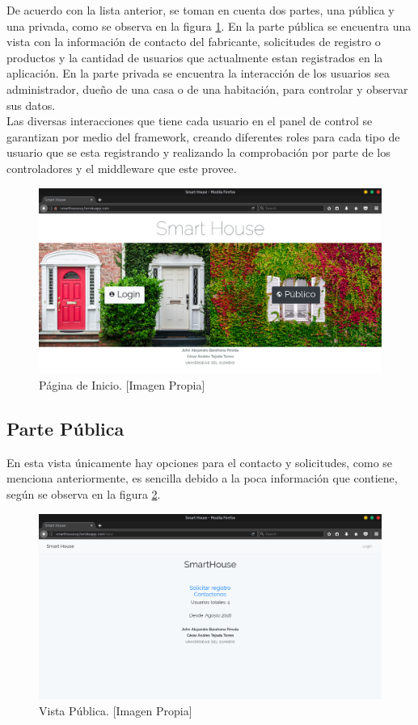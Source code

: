 De acuerdo con la lista anterior, se toman en cuenta dos partes, una pública y una privada, como se observa en la figura \ref{fig:index}. En la parte pública se encuentra una vista con la información de contacto del fabricante, solicitudes de registro o productos y la cantidad de usuarios que actualmente estan registrados en la aplicación. En la parte privada se encuentra la interacción de los usuarios sea administrador, dueño de una casa o de una habitación, para controlar y observar sus datos.\\

Las diversas interacciones que tiene cada usuario en el panel de control se garantizan por medio del framework, creando diferentes roles para cada tipo de usuario que se esta registrando y realizando la comprobación por parte de los controladores y el middleware que este provee.\\

\begin{figure}[H]
\centering
\caption{Página de Inicio. [Imagen Propia]}
\label{fig:index}
\includegraphics[width=0.5\linewidth]{Imagenes/Index}
\end{figure}

\subsection{Parte Pública}

En esta vista únicamente hay opciones para el contacto y solicitudes, como se menciona anteriormente, es sencilla debido a la poca información que contiene, según se observa en la figura \ref{fig:publicview}.

\begin{figure}[H]
\centering
\caption{Vista Pública. [Imagen Propia]}
\label{fig:publicview}
\includegraphics[width=0.5\linewidth]{Imagenes/Public_view}
\end{figure}

